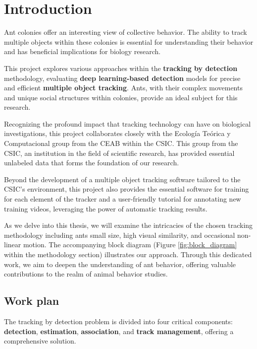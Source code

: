 
\section{Introduction}

{
    Ant colonies offer an interesting view of collective behavior. 
    The ability to track multiple objects within these colonies is essential for understanding their behavior and has beneficial implications for biology research.
}

{
    This project explores various approaches within the \textbf{tracking by detection} methodology, 
    evaluating \textbf{deep learning-based detection} models for precise and efficient \textbf{multiple object tracking}. 
    Ants, with their complex movements and unique social structures within colonies, provide an ideal subject for this research.
}

{
    Recognizing the profound impact that tracking technology can have on biological investigations, 
    this project collaborates closely with the Ecología Teórica y Computacional group from the \ac{CEAB} within the \ac{CSIC}. 
    This group from the \ac{CSIC}, an institution in the field of scientific research, has provided essential unlabeled data that forms the foundation of our research.
}

{
    Beyond the development of a multiple object tracking software tailored to the \ac{CSIC}'s environment, 
    this project also provides the essential software for training for each element of the tracker and a user-friendly tutorial for annotating new training videos, 
    leveraging the power of automatic tracking results.
}

{
    As we delve into this thesis, we will examine the intricacies of the chosen tracking methodology including ants small size, high visual similarity, and occasional non-linear motion. 
    The accompanying block diagram (Figure \ref{fig:block_diagram} within the methodology section) illustrates our approach. 
    Through this dedicated work, we aim to deepen the understanding of ant behavior, offering valuable contributions to the realm of animal behavior studies.
}

\clearpage

\needspace{0.25\textheight}
\subsection{Work plan}

{
    The tracking by detection problem is divided into four critical components: 
    \textbf{detection}, \textbf{estimation}, \textbf{association}, and \textbf{track management}, offering a comprehensive solution.
}

